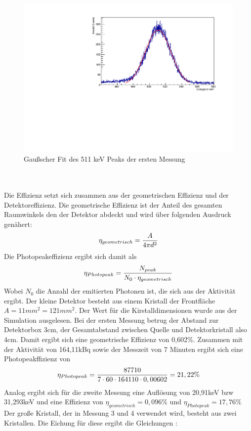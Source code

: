 \documentclass[a4paper,14pt,twoside]{article}
\begin{document}
\begin{figure}[H]
	\begin{center}
	\includegraphics[width=0.7\linewidth]{Fit1.pdf}
	\caption{Gaußscher Fit des 511 keV Peaks der ersten Messung}
	\label{l2}
	\end{center}
\end{figure}
\ \\
\ \\
Die Effizienz setzt sich zusammen aus der geometrischen Effizienz und der Detektoreffizienz. Die geometrische Effizienz ist der Anteil des gesamten Raumwinkels den der Detektor abdeckt und wird über folgenden Ausdruck genähert:
\begin{equation}
\eta_{geometrisch}={A\over 4 \pi d^2}
\end{equation}
Die Photopeakeffizienz ergibt sich damit als
\begin{equation}
\eta_{Photopeak}={N_{peak}\over N_0\cdot\eta_{geometrisch}} \label{eq:Photopeak}
\end{equation}
Wobei $N_0$ die Anzahl der emitierten Photonen ist, die sich aus der Aktivität ergibt. Der kleine Detektor besteht aus einem Kristall der Frontfläche $A=11mm^2=121mm^2$. Der Wert für die Kirstalldimensionen wurde aus der Simulation ausgelesen. Bei der ersten Messung betrug der Abstand zur Detektorbox 3cm, der Gesamtabstand zwischen Quelle und Detektorkristall also 4cm. Damit ergibt sich eine geometrische Effizienz von 0,602\%. Zusammen mit der Aktivität von 164,11kBq sowie der Messzeit von 7 Minuten ergibt sich eine Photopeakffizienz von
\begin{equation}
\eta_{Photopeak}={87710\over 7\cdot60\cdot164110\cdot0,00602}=21,22\%
\end{equation}
Analog ergibt sich für die zweite Messung eine Auflösung von 20,91keV bzw 31,293keV und eine Effizienz von $\eta_{geometrisch}=0,096\%$ und $\eta_{Photopeak}=17,76\%$
Der große Kristall, der in Messung 3 und 4 verwendet wird, besteht aus zwei Kristallen. Die Eichung für diese ergibt die Gleichungen :
\end{document}
